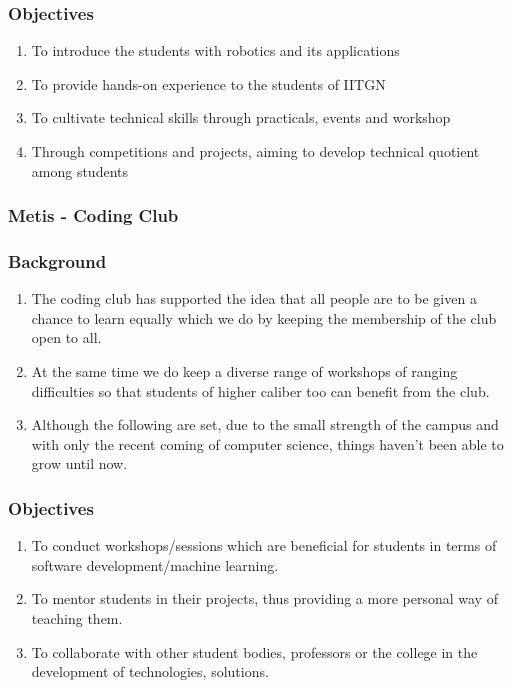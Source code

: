 \documentclass[12pt]{article}
\begin{document}
\subsubsection*{Objectives}
\begin{enumerate}
    \item To introduce the students with robotics and its applications
    \item To provide hands-on experience to the students of IITGN
    \item To cultivate technical skills through practicals, events and workshop
    \item Through competitions and projects, aiming to develop technical quotient among students
\end{enumerate}

\subsubsection{Metis - Coding Club}
\subsubsection*{Background}
\begin{enumerate}
    \item The coding club has supported the idea that all people are to be given a chance to learn equally which we do by keeping the membership of the club open to all.
    \item At the same time we do keep a diverse range of workshops of ranging difficulties so that students of higher caliber too can benefit from the club.
    \item Although the following are set, due to the small strength of the campus and with only the recent coming of computer science, things haven't been able to grow until now.
\end{enumerate}

\subsubsection*{Objectives}
\begin{enumerate}
    \item To conduct workshops/sessions which are beneficial for students in terms of software development/machine learning.
    \item To mentor students in their projects, thus providing a more personal way of teaching them.
    \item To collaborate with other student bodies, professors or the college in the development of technologies, solutions.
\end{enumerate}
\end{document}
